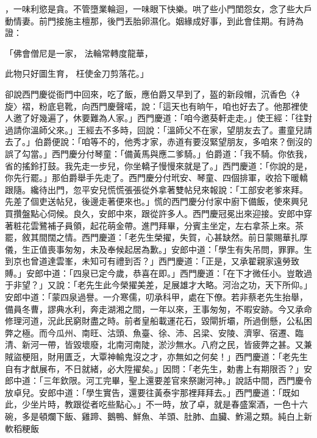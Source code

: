 \begin{showcontents}{}
，一味利慾是貪。不管墮業輪迴，一味眼下快樂。哄了些小門閨怨女，念了些大戶動情妻。前門接施主檀那，後門丟胎卵濕化。姻緣成好事，到此會佳期。有詩為證：

「佛會僧尼是一家，  法輪常轉度龍華，

此物只好圖生育，  枉使金刀剪落花。」

卻說西門慶從衙門中回來，吃了飯，應伯爵又早到了，盔的新段帽，沉香色〈衤旋〉褶，粉底皂靴，向西門慶聲喏，說：「這天也有晌午，咱也好去了。他那裡使人邀了好幾遍了，休要難為人家。」西門慶道：「咱今邀葵軒走走。」使王經：「往對過請你溫師父來。」王經去不多時，回說：「溫師父不在家，望朋友去了。畫童兒請去了。」伯爵便說：「咱等不的，他秀才家，赤道有要沒緊望朋友，多咱來？倒沒的誤了勾當。」西門慶分付琴童：「備黃馬與應二爹騎。」伯爵道：「我不騎。你依我，省的搖鈴打鼓。我先走一步兒，你坐轎子慢慢來就是了。」西門慶道：「你說的是，你先行罷。」那伯爵舉手先走了。西門慶分付玳安、琴童、四個排軍，收拾下暖轎跟隨。纔待出門，忽平安兒慌慌張張從外拿著雙帖兒來報說：「工部安老爹來拜。先差了個吏送帖兒，後邊走著便來也。」慌的西門慶分付家中廚下備飯，使來興兒買攢盤點心伺候。良久，安郎中來，跟從許多人。西門慶冠冕出來迎接。安郎中穿著粧花雲鷺補子員領，起花萌金帶。進門拜畢，分賓主坐定，左右拿茶上來。茶罷，敘其間闊之情。西門慶道：「老先生榮擢，失賀，心甚缺然。前日蒙賜華扎厚儀，生正值喪事匆匆，未及奉候起居為歉。」安郎中道：「學生有失吊問，罪罪。生到京也曾道達雲峯，未知可有禮到否？」西門慶道：「正是，又承翟親家遠勞致賻。」安郎中道：「四泉已定今歲，恭喜在即。」西門慶道：「在下才微任小。豈敢過于非望？」又說：「老先生此今榮擢美差，足展雄才大略。河治之功，天下所仰。」安郎中道：「蒙四泉過譽。一介寒儒，叨承科甲，處在下僚。若非蔡老先生抬舉，備員冬曹，謬典水利，奔走湖湘之間，一年以來，王事匆匆，不暇安跡。今又承命修理河道，況此民窮財盡之時。前者皇船載運花石，毀閘折壩，所過倒懸，公私困弊之極。而今瓜州、南旺、沽頭、魚臺、徐、沛、呂梁、安陵、濟寧、宿遷、臨清、新河一帶，皆毀壞廢，北南河南陡，淤沙無水。八府之民，皆疲弊之甚。又兼賊盜梗阻，財用匱乏，大覃神輸鬼沒之才，亦無如之何矣！」西門慶道：「老先生自有才猷展布，不日就緒，必大陞擢矣。」因問：「老先生，勅書上有期限否？」安郎中道：「三年欽限。河工完畢，聖上還要差官來祭謝河神。」說話中間，西門慶令放卓兒。安郎中道：「學生實告，還要往黃泰宇那裡拜拜去。」西門慶道：「既如此，少坐片時，教跟從者吃些點心。」不一時，放了卓，就是春盛案酒，一色十六碗，多是頓爛下飯、雞蹄、鵝鴨、鮮魚、羊頭、肚肺、血臟、鮓湯之類。純白上新軟稻粳飯 
\end{showcontents}
